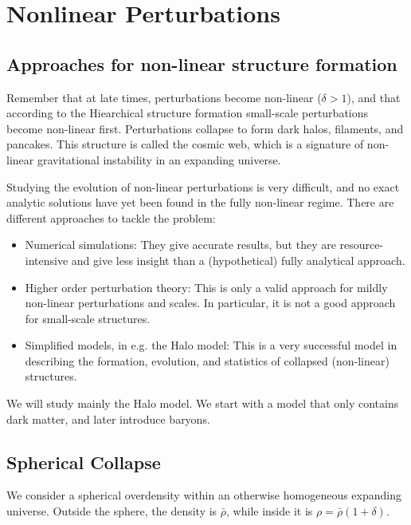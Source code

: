 \chapter{Nonlinear Perturbations}

\section{Approaches for non-linear structure formation}

Remember that at late times, perturbations become non-linear ($\delta > 1$), and that according to the Hiearchical structure formation small-scale perturbations become non-linear first.
Perturbations collapse to form dark halos, filaments, and pancakes.
This structure is called the cosmic web, which is a signature of non-linear gravitational instability in an expanding universe.

Studying the evolution of non-linear perturbations is very difficult, and no exact analytic solutions have yet been found in the fully non-linear regime.
There are different approaches to tackle the problem:
\begin{itemize}
	\item Numerical simulations: They give accurate results, but they are resource-intensive and give less insight than a (hypothetical) fully analytical approach.
	\item Higher order perturbation theory: This is only a valid approach for mildly non-linear perturbations and scales.
	In particular, it is not a good approach for small-scale structures.
	\item Simplified models, in e.g. the Halo model: This is a very successful model in describing the formation, evolution, and statistics of collapsed (non-linear) structures.
\end{itemize}

We will study mainly the Halo model. We start with a model that only contains dark matter, and later introduce baryons.

\section{Spherical Collapse}

We consider a spherical overdensity within an otherwise homogeneous expanding universe. Outside the sphere, the density is $\bar{\rho}$, while inside it is $\rho = \bar{\rho}(1+\delta)$.

